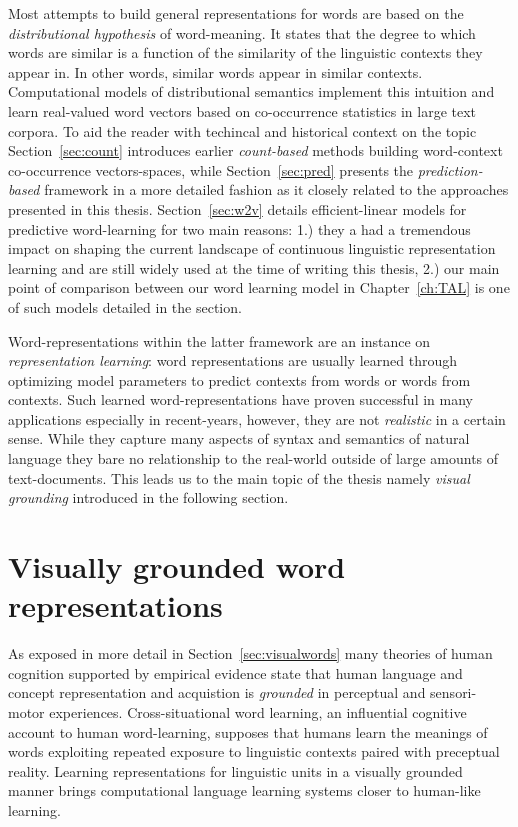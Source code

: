 Most attempts to build  general representations for words are based on the 
\emph{distributional hypothesis} of word-meaning. It states that the degree to which words are similar 
is a function of the similarity of the linguistic contexts they appear in. In other words, similar 
words appear in similar contexts. Computational models of distributional
semantics implement this intuition and learn real-valued word vectors based on co-occurrence
statistics in large text corpora.
To aid the reader with techincal and historical context 
on the topic Section~\ref{sec:count} introduces earlier \emph{count-based} methods building word-context co-occurrence vectors-spaces, 
while  Section~\ref{sec:pred} presents the  \emph{prediction-based} framework in a more 
detailed fashion as it closely related
to the approaches presented in this thesis. 
Section~\ref{sec:w2v} details efficient-linear 
models for predictive word-learning for two main reasons: 1.) they a had a tremendous impact
on shaping the current landscape of continuous linguistic representation learning and are still
widely used at the time of writing this thesis, 2.) our main point of comparison between
our word learning model in Chapter~\ref{ch:TAL} is one of such models detailed in the section.


Word-representations within the latter framework are an instance on \emph{representation learning}:
word representations are usually learned through
optimizing model parameters to predict contexts from words or words from contexts.
Such learned word-representations have proven successful in many applications especially 
in recent-years, however, they are not \emph{realistic} in a certain sense. While they capture many
aspects of syntax and semantics of natural language they bare no relationship to the real-world
outside of large amounts of text-documents.
This leads us to the main topic of the thesis namely \emph{visual grounding} introduced in the
following section.

\section{Visually grounded word representations}


As exposed in more detail in Section~\ref{sec:visualwords} many theories of human cognition supported by empirical
evidence state that human language and concept representation and acquistion is \emph{grounded}
in perceptual and sensori-motor experiences. Cross-situational word learning, 
an influential cognitive account to human word-learning, supposes that humans learn the
meanings of words exploiting repeated exposure to linguistic contexts paired with preceptual reality.
Learning representations for linguistic units in a visually grounded manner brings
computational language learning systems closer to human-like learning.

